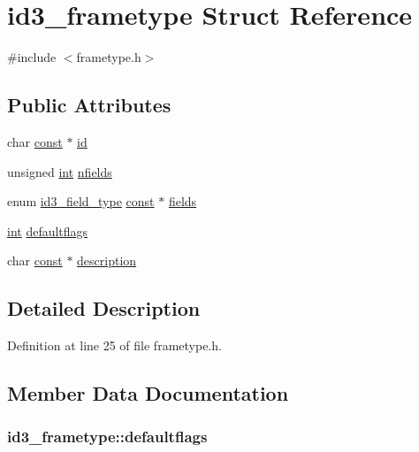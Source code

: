 \hypertarget{structid3__frametype}{}\section{id3\+\_\+frametype Struct Reference}
\label{structid3__frametype}


{\ttfamily \#include $<$frametype.\+h$>$}

\subsection*{Public Attributes}
\begin{DoxyCompactItemize}
\item 
char \hyperlink{getopt1_8c_a2c212835823e3c54a8ab6d95c652660e}{const} $\ast$ \hyperlink{structid3__frametype_aaa7c1eff1a15e6a9649fc41062fd904b}{id}
\item 
unsigned \hyperlink{xmltok_8h_a5a0d4a5641ce434f1d23533f2b2e6653}{int} \hyperlink{structid3__frametype_ac8b2f6783047249f4f3feaf937ad7903}{nfields}
\item 
enum \hyperlink{id3tag_8h_a0cb7be9ff485c843c1b69600f5c83d41}{id3\+\_\+field\+\_\+type} \hyperlink{getopt1_8c_a2c212835823e3c54a8ab6d95c652660e}{const} $\ast$ \hyperlink{structid3__frametype_a6723658ff5b0c5dcc9cef389cba93cb3}{fields}
\item 
\hyperlink{xmltok_8h_a5a0d4a5641ce434f1d23533f2b2e6653}{int} \hyperlink{structid3__frametype_a77daf68f1df3699f53730c362cf5baa7}{defaultflags}
\item 
char \hyperlink{getopt1_8c_a2c212835823e3c54a8ab6d95c652660e}{const} $\ast$ \hyperlink{structid3__frametype_ad70edb7fbf92202a1828180a46925b6d}{description}
\end{DoxyCompactItemize}


\subsection{Detailed Description}


Definition at line 25 of file frametype.\+h.



\subsection{Member Data Documentation}
\subsubsection[{\texorpdfstring{defaultflags}{defaultflags}}]{ id3\+\_\+frametype\+::defaultflags}\hypertarget{structid3__frametype_a77daf68f1df3699f53730c362cf5baa7}{}\label{structid3__frametype_a77daf68f1df3699f53730c362cf5baa7}



